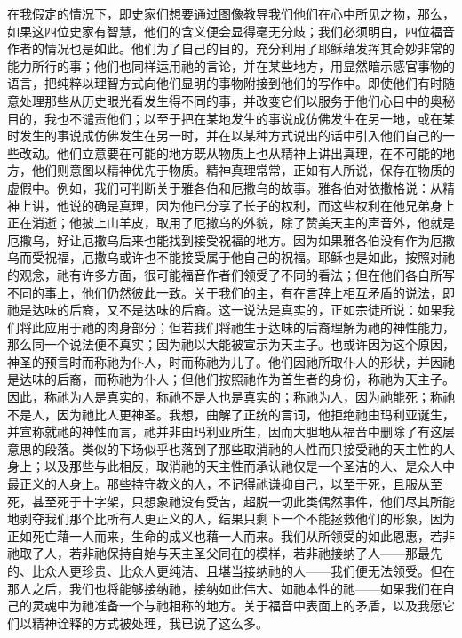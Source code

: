 在我假定的情况下，即史家们想要通过图像教导我们他们在心中所见之物，那么，如果这四位史家有智慧，他们的含义便会显得毫无分歧；我们必须明白，四位福音作者的情况也是如此。他们为了自己的目的，充分利用了耶稣藉发挥其奇妙非常的能力所行的事；他们也同样运用祂的言论，并在某些地方，用显然暗示感官事物的语言，把纯粹以理智方式向他们显明的事物附接到他们的写作中。即使他们有时随意处理那些从历史眼光看发生得不同的事，并改变它们以服务于他们心目中的奥秘目的，我也不谴责他们；以至于把在某地发生的事说成仿佛发生在另一地，或在某时发生的事说成仿佛发生在另一时，并在以某种方式说出的话中引入他们自己的一些改动。他们立意要在可能的地方既从物质上也从精神上讲出真理，在不可能的地方，他们则意图以精神优先于物质。精神真理常常，正如有人所说，保存在物质的虚假中。例如，我们可判断关于雅各伯和厄撒乌的故事。雅各伯对依撒格说：从精神上讲，他说的确是真理，因为他已分享了长子的权利，而这些权利在他兄弟身上正在消逝；他披上山羊皮，取用了厄撒乌的外貌，除了赞美天主的声音外，他就是厄撒乌，好让厄撒乌后来也能找到接受祝福的地方。因为如果雅各伯没有作为厄撒乌而受祝福，厄撒乌或许也不能接受属于他自己的祝福。耶稣也是如此，按照对祂的观念，祂有许多方面，很可能福音作者们领受了不同的看法；但在他们各自所写不同的事上，他们仍然彼此一致。关于我们的主，有在言辞上相互矛盾的说法，即祂是达味的后裔，又不是达味的后裔。这一说法是真实的，正如宗徒所说：如果我们将此应用于祂的肉身部分；但若我们将祂生于达味的后裔理解为祂的神性能力，那么同一个说法便不真实；因为祂以大能被宣示为天主子。也或许因为这个原因，神圣的预言时而称祂为仆人，时而称祂为儿子。他们因祂所取仆人的形状，并因祂是达味的后裔，而称祂为仆人；但他们按照祂作为首生者的身份，称祂为天主子。因此，称祂为人是真实的，称祂不是人也是真实的；称祂为人，因为祂能死；称祂不是人，因为祂比人更神圣。我想，曲解了正统的言词，他拒绝祂由玛利亚诞生，并宣称就祂的神性而言，祂并非由玛利亚所生，因而大胆地从福音中删除了有这层意思的段落。类似的下场似乎也落到了那些取消祂的人性而只接受祂的天主性的人身上；以及那些与此相反，取消祂的天主性而承认祂仅是一个圣洁的人、是众人中最正义的人身上。那些持守教义的人，不记得祂谦抑自己，以至于死，且服从至死，甚至死于十字架，只想象祂没有受苦，超脱一切此类偶然事件，他们尽其所能地剥夺我们那个比所有人更正义的人，结果只剩下一个不能拯救他们的形象，因为正如死亡藉一人而来，生命的成义也藉一人而来。我们从所领受的如此恩惠，若非祂取了人，若非祂保持自始与天主圣父同在的模样，若非祂接纳了人——那最先的、比众人更珍贵、比众人更纯洁、且堪当接纳祂的人——我们便无法领受。但在那人之后，我们也将能够接纳祂，接纳如此伟大、如祂本性的祂——如果我们在自己的灵魂中为祂准备一个与祂相称的地方。关于福音中表面上的矛盾，以及我愿它们以精神诠释的方式被处理，我已说了这么多。\par

